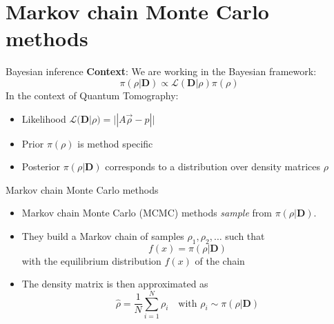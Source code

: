 \documentclass{beamer}
\newcommand{\mb}{\mathbf}
\newcommand{\tb}{\textbf}
\begin{document}
\section{Markov chain Monte Carlo methods}
\begin{frame}{Bayesian inference}
    \tb{Context}: We are working in the Bayesian framework:
    \begin{equation}
        \pi (\rho|\mb D) \propto \mathcal{L}(\mb D|\rho) \pi(\rho)
    \end{equation}
    In the context of Quantum Tomography:
    \begin{itemize}
        \item Likelihood $\mathcal{L}(\mb D|\rho) = ||A \vec\rho - \hat p||$
        \item Prior $\pi(\rho)$ is method specific
        \item Posterior $\pi (\rho|\mb D)$ corresponds to a distribution over density matrices $\rho$ 
    \end{itemize}
\end{frame}
\begin{frame}{Markov chain Monte Carlo methods}
    \begin{itemize}
        \item Markov chain Monte Carlo (MCMC) methods \textit{sample} from $\pi (\rho|\mb D)$.
        \item They build a Markov chain of samples $\rho_1, \rho_2, \dots$ such that
        \begin{equation}
            f(x) =\pi (\rho|\mb D)
        \end{equation}
        with the equilibrium distribution $f(x)$ of the chain
        \item The density matrix is then approximated as 
        \begin{equation}
            \hat \rho = \frac{1}{N}\sum_{i=1}^N \rho_i \quad \text{with } \rho_i \sim \pi(\rho|\mb D)
        \end{equation}
    \end{itemize}
\end{frame}
\end{document}
